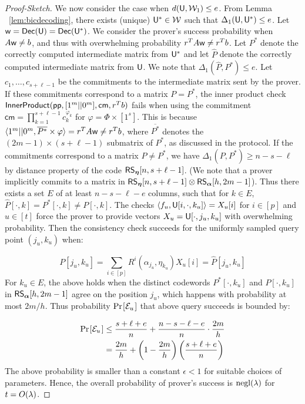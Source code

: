 \begin{proof}[Proof-Sketch]
We now consider the case when $d(\mathsf{U},\mathcal{W}_1)\leq e$. From Lemma
~\ref{lem:bicdecoding}, there exists (unique) $\mathsf{U}^*\in \mathcal{W}$
such that $\Delta_1(\mathsf{U},\mathsf{U}^*)\leq e$.
Let $\mathsf{w}=\mathsf{Dec}(\mathsf{U})=\mathsf{Dec}(\mathsf{U}^*)$. We consider the prover's success
probability when $A\mathsf{w}\neq b$, and thus with overwhelming probability $r^TA \mathsf{w} \neq
r^Tb$. Let $P^*$ denote the correctly computed intermediate matrix from $\mathsf{U}^*$ and let
$\hat{P}$ denote the correctly computed intermediate matrix from $\mathsf{U}$. We note that
$\Delta_1(\hat{P},P^*)\leq e$. Let $c_1,\ldots,c_{s+\ell-1}$ be the commitments
to the intermediate matrix sent by the prover. If these commitments correspond to a
matrix $P=P^*$, the inner product check
$\mathsf{InnerProduct}(\mathsf{pp},[1^m||0^m],\mathsf{cm},r^Tb)$ fails when using the
commitment $\mathsf{cm}=\prod_{k=1}^{s+\ell-1}c_k^{\varphi_k}$ for
$\varphi=\Phi\times [1^s]$. This is because $\langle 1^m||0^m,\overline{P^*}\times
\varphi\rangle=r^TA\mathsf{w}\neq r^Tb$, where $\overline{P^*}$ denotes the
$(2m-1)\times (s+\ell-1)$ submatrix of $P^*$,
as discussed in the protocol. If the
commitments correspond  to a matrix $P\neq P^*$, we have
$\Delta_1(P,P^*)\geq n-s-\ell$ by distance property of the code
$\mathsf{RS}_{\bm{\eta}}[n, s+\ell-1]$. 
(We note that a prover implicitly commits to a matrix in
$\mathsf{RS}_{\bm{\eta}}[n,s+\ell-1]\otimes \mathsf{RS}_{\bm{\alpha}}[h,2m-1]$).
Thus there exists a set $E$ of at least $n-s-\ell-e$ columns, such that for
$k\in E$, $\hat{P}[\cdot,k]=P^*[\cdot,k]\neq P[\cdot,k]$. The checks
$\langle f_u,\mathsf{U}[i,\cdot,k_u]\rangle=X_u[i]$ for $i\in [p]$ and $u\in [t]$ 
force the prover to provide vectors $X_u=\mathsf{U}[\cdot,j_u,k_u]$ with
overwhelming probability. Then the consistency check succeeds for the 
uniformly sampled query point $(j_u,k_u)$ when:

{\footnotesize
\[ P[j_u,k_u] = \sum_{i\in [p]}R^i(\alpha_{j_u},\eta_{k_u})X_u[i] =
\hat{P}[j_u,k_u] \]}
For $k_u\in E$, the above holds when the distinct codewords $P^*[\cdot,k_u]$ and
$P[\cdot,k_u]$ in $\mathsf{RS}_{\bm{\alpha}}[h,2m-1]$ agree on the position $j_u$, which happens with 
probability at most $2m/h$. Thus probability $\prob{\mc{E}_u}$ that above query succeeds is bounded by:

{\footnotesize
\begin{align*}
\prob{\mc{E}_u}&\leq \frac{s+\ell+e}{n} + \frac{n-s-\ell-e}{n}\cdot\frac{2m}{h}
\\
&= \frac{2m}{h}+\left(1-\frac{2m}{h}\right)\left(\frac{s+\ell+e}{n}\right)
\end{align*}
}
The above probability is smaller than a constant $\epsilon<1$ for suitable
choices of parameters. Hence, the overall probability of prover's success is
$\mathrm{negl}(\lambda)$ for $t=O(\lambda)$.
\end{proof}
